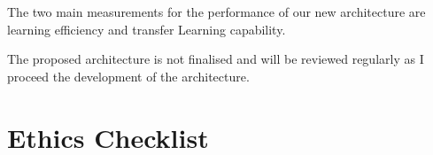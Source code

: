 \documentclass[12pt,twoside]{report}
\begin{document}
The two main measurements for the performance of our new architecture are learning efficiency and transfer Learning capability. 


The proposed architecture is not finalised and will be reviewed regularly as I proceed the development of the architecture.

%
%


\chapter{Ethics Checklist}
\label{ethics_checklist}
\end{document}
